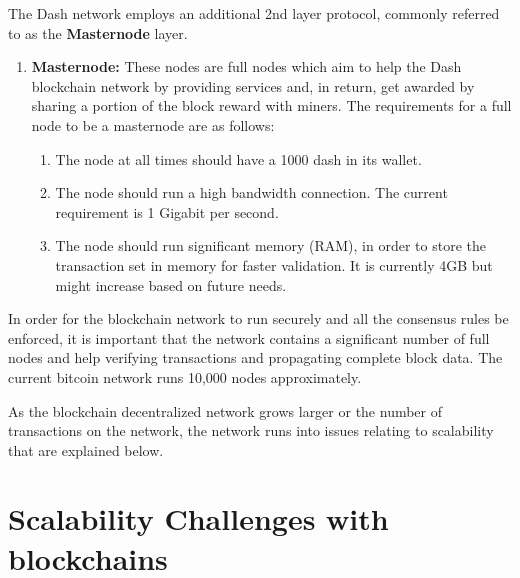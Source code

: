 \begin{enumerate}
\begin{enumerate}
        \end{enumerate}

\end{enumerate}

The Dash network \citep{dash-whitepaper} employs an additional 2nd layer protocol, commonly referred to
as the \textbf{Masternode} layer.


\begin{enumerate}

    \item \textbf{Masternode:}
        These nodes are full nodes which aim to help the
        Dash blockchain network by providing services and, in return, get
        awarded by sharing a portion of the block reward with miners. The
        requirements for a full node to be a masternode are as follows:

        \begin{enumerate}
            \item The node at all times should have a 1000 dash in its wallet.
            \item The node should run a high bandwidth connection. The current
                requirement is 1 Gigabit per second.
            \item The node should run significant memory (RAM), in order to store
                the transaction set in memory for faster validation. It is
                currently 4GB but might increase based on future needs.  
        \end{enumerate}

\end{enumerate}

In order for the blockchain network to run securely and all the consensus rules
be enforced, it is important that the network contains a significant number of
full nodes and help verifying transactions and propagating complete block data.
The current bitcoin network runs 10,000 nodes approximately. 

As the blockchain decentralized network grows larger or the number of transactions on the network, the
network runs into issues relating to scalability that are explained below.


\section{Scalability Challenges with blockchains}

